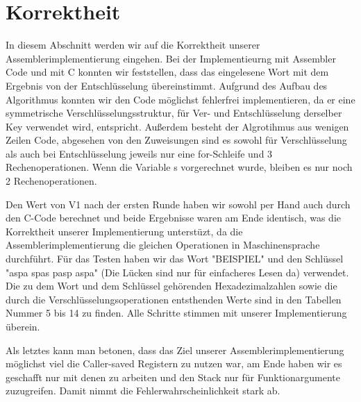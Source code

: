 \documentclass[course=asp]{aspdoc}
\begin{document}
\section{Korrektheit}
In diesem Abschnitt werden wir auf die Korrektheit unserer Assemblerimplementierung eingehen. Bei der Implementieurng mit Assembler Code und mit C konnten wir feststellen,
dass das eingelesene Wort mit dem Ergebnis von der Entschlüsselung übereinstimmt. Aufgrund des Aufbau des Algorithmus konnten wir den Code möglichst fehlerfrei implementieren,
da er eine symmetrische Verschlüsselungsstruktur, für Ver- und Entschlüsselung derselber Key verwendet wird, entspricht. Außerdem besteht der Algrotihmus aus wenigen Zeilen Code,
abgesehen von den Zuweisungen sind es sowohl für Verschlüsselung als auch bei Entschlüsselung jeweils nur eine for-Schleife und 3 Rechenoperationen. Wenn die Variable s vorgerechnet wurde,
bleiben es nur noch 2 Rechenoperationen.

Den Wert von V1 nach der ersten Runde haben wir sowohl per Hand auch durch den C-Code berechnet und beide Ergebnisse waren am Ende identisch, was die Korrektheit unserer Implementierung
unterstüzt, da die Assemblerimplementierung die gleichen Operationen in Maschinensprache durchführt. Für das Testen haben wir das Wort "BEISPIEL" und den Schlüssel "aspa spas pasp aspa" (Die Lücken sind nur für einfacheres Lesen da)
verwendet. Die zu dem Wort und dem Schlüssel gehörenden Hexadezimalzahlen sowie die durch die Verschlüsselungsoperationen entsthenden Werte sind in den Tabellen Nummer 5 bis 14 zu finden. Alle Schritte stimmen mit unserer Implementierung
überein.

Als letztes kann man betonen, dass das Ziel unserer Assemblerimplementierung möglichst viel die Caller-saved Registern zu nutzen war, am Ende haben wir es geschafft nur mit denen zu arbeiten und den Stack nur für Funktionargumente
zuzugreifen. Damit nimmt die Fehlerwahrscheinlichkeit stark ab.
\newpage
\end{document}
